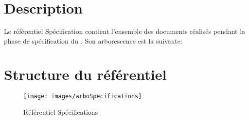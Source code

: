 \section{Description}

Le référentiel Spécification contient l’ensemble des documents réalisés pendant la phase de spécification du \PICCourt. Son arborescence est la suivante:

\section{Structure du référentiel}

\begin{figure}[ht]

         \begin{center}

         \texttt{[image: images/arboSpecifications]}

         \end{center}

         \caption{Référentiel Spécifications}
 \end{figure}
